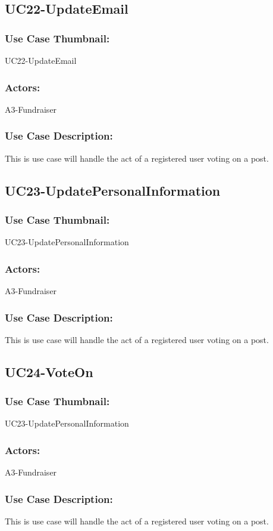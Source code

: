 \documentclass[11pt, openany]{report}
\begin{document}
\subsection{UC22-UpdateEmail}
\label{sUC22}
\subsubsection*{Use Case Thumbnail:}
UC22-UpdateEmail
\subsubsection*{Actors:}
A3-Fundraiser
\subsubsection*{Use Case Description:}
This is use case will handle the act of a registered user voting on a post.

\subsection{UC23-UpdatePersonalInformation}
\label{sUC23}
\subsubsection*{Use Case Thumbnail:}
UC23-UpdatePersonalInformation
\subsubsection*{Actors:}
A3-Fundraiser
\subsubsection*{Use Case Description:}
This is use case will handle the act of a registered user voting on a post.

\subsection{UC24-VoteOn}
\label{sUC24}
\subsubsection*{Use Case Thumbnail:}
UC23-UpdatePersonalInformation
\subsubsection*{Actors:}
A3-Fundraiser
\subsubsection*{Use Case Description:}
This is use case will handle the act of a registered user voting on a post.
\end{document}
